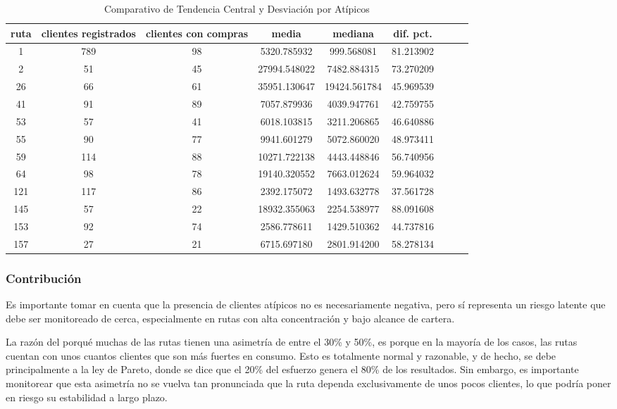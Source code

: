 \documentclass[12pt, letterpaper]{article}
\begin{document}
\begin{table}[htbp]
\caption{Comparativo de Tendencia Central y Desviación por Atípicos}
\label{tab:tendencia_central}
\begin{tabular}{ccccccccc}
\toprule
ruta & clientes registrados & clientes con compras & media & mediana & dif. pct. \\
\midrule
1 & 789 & 98 & 5320.785932 & 999.568081 & 81.213902 \\
2 & 51 & 45 & 27994.548022 & 7482.884315 & 73.270209 \\
26 & 66 & 61 & 35951.130647 & 19424.561784 & 45.969539 \\
41 & 91 & 89 & 7057.879936 & 4039.947761 & 42.759755 \\
53 & 57 & 41 & 6018.103815 & 3211.206865 & 46.640886 \\
55 & 90 & 77 & 9941.601279 & 5072.860020 & 48.973411 \\
59 & 114 & 88 & 10271.722138 & 4443.448846 & 56.740956 \\
64 & 98 & 78 & 19140.320552 & 7663.012624 & 59.964032 \\
121 & 117 & 86 & 2392.175072 & 1493.632778 & 37.561728 \\
145 & 57 & 22 & 18932.355063 & 2254.538977 & 88.091608 \\
153 & 92 & 74 & 2586.778611 & 1429.510362 & 44.737816 \\
157 & 27 & 21 & 6715.697180 & 2801.914200 & 58.278134 \\
\bottomrule
\end{tabular}
\end{table}

\subsubsection{Contribución}

Es importante tomar en cuenta que la presencia de clientes atípicos no es necesariamente negativa, pero sí representa un riesgo latente que debe ser monitoreado de cerca,
especialmente en rutas con alta concentración y bajo alcance de cartera.

La razón del porqué muchas de las rutas tienen una asimetría de entre el 30\% y 50\%, es porque en la mayoría de los casos, las rutas cuentan con unos cuantos clientes que son
más fuertes en consumo. Esto es totalmente normal y razonable, y de hecho, se debe principalmente a la ley de Pareto, donde se dice que el 20\% del esfuerzo genera el 80\% de los resultados. Sin embargo, es importante monitorear que esta asimetría no se vuelva tan pronunciada que la ruta dependa exclusivamente de unos pocos clientes, lo que podría poner en riesgo su estabilidad a largo plazo.
\end{document}
